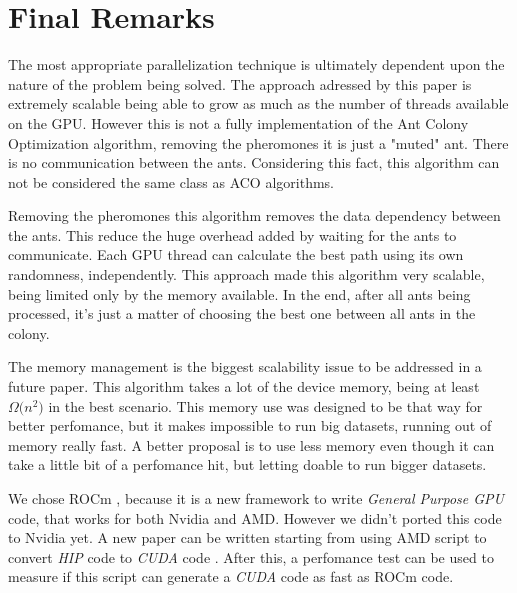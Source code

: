 \section{Final Remarks}

The most appropriate parallelization technique is ultimately dependent upon the
nature of the problem being solved. The approach adressed by this paper
is extremely scalable being able to grow as much as the number of threads available on the GPU.
However this is not a fully implementation of the Ant Colony Optimization algorithm,
removing the pheromones it is just a "muted" ant. There is no communication between the ants.
Considering this fact, this algorithm can not be considered the same class as
ACO algorithms.

Removing the pheromones this algorithm removes the data dependency between the ants.
This reduce the huge overhead added by waiting for the ants to communicate. Each GPU
thread can calculate the best path using its own randomness, independently. This approach made this algorithm
very scalable, being limited only by the memory available. In the end, after all ants
being processed, it's just a matter of choosing the best one between all ants in the colony.

The memory management is the biggest scalability issue to be addressed in a future paper. This algorithm
takes a lot of the device memory, being at least $\Omega({n^{2})}$ in the best scenario.
This memory use was designed to be that way for better perfomance, but it makes impossible to run big datasets, running out
of memory really fast. A better proposal is to use less memory even though it can take a little bit of a perfomance hit, but
letting doable to run bigger datasets.

We chose ROCm \cite{rocm}, because it is a new framework to write \emph{General Purpose GPU} code, that
works for both Nvidia and AMD. However we didn't ported this code to Nvidia yet. A new paper can be
written starting from using AMD script to convert \emph{HIP} code to \emph{CUDA}
code \cite{hipifyamd}. After this, a perfomance test can be used to measure if this script can
generate a \emph{CUDA} code as fast as ROCm code.
